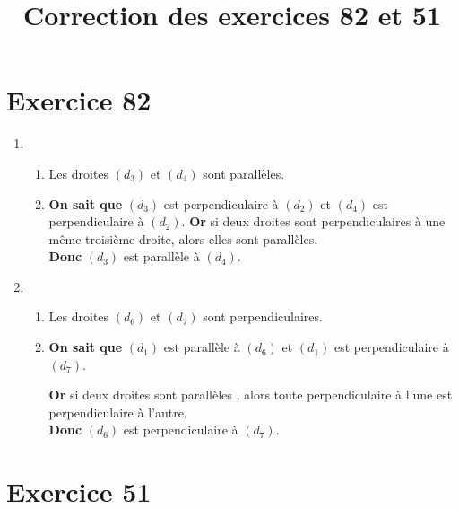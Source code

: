 \documentclass[12pt,a4paper]{article}
\title{Correction des exercices 82 et 51}
\date{}
\begin{document}
	
	\maketitle
	
	\section*{Exercice 82}
	\begin{enumerate}[label=\arabic*)]
		\item \begin{enumerate}[label=\alph*)]
			\item Les droites $(d_3)$ et $(d_4)$ sont parallèles.
			
			\item 
			\textbf{On sait que} $(d_3)$ est perpendiculaire à $(d_2)$ et $(d_4)$ est perpendiculaire à $(d_2)$. %
			\textbf{Or} si deux droites sont perpendiculaires à une même troisième droite, alors elles sont parallèles.\\
			\textbf{Donc} $(d_3)$ est parallèle à $(d_4)$. %
		\end{enumerate}
	
	
		\item \begin{enumerate}[label=\alph*)]
			\item Les droites $(d_6)$ et $(d_7)$ sont perpendiculaires.
			
			\item 
			\textbf{On sait que} $(d_1)$ est parallèle à $(d_6)$ et $(d_1)$ est perpendiculaire à $(d_7)$. %
			
			\textbf{Or} si deux droites sont parallèles , alors toute perpendiculaire à l'une est perpendiculaire à l'autre.\\
			\textbf{Donc} $(d_6)$ est perpendiculaire à $(d_7)$. %
		\end{enumerate}
	\end{enumerate}

	\section*{Exercice 51}
	
\end{document}
